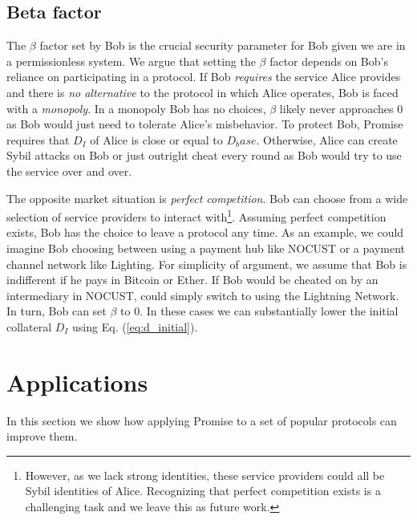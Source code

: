 \documentclass[runningheads]{llncs}
\newcommand{\sys}{Promise\xspace}
\newcommand{\aza}[1]{\todo[linecolor=blue,backgroundcolor=blue!25,bordercolor=blue,inline,caption={}]{Comment by Alexei: #1}}
\begin{document}
\subsection{Beta factor}
The $\beta$ factor set by Bob is the crucial security parameter for Bob given we are in a permissionless system.
We argue that setting the $\beta$ factor depends on Bob's reliance on participating in a protocol.
If Bob \emph{requires} the service Alice provides and there is \emph{no alternative} to the protocol in which Alice operates, Bob is faced with a \emph{monopoly}.
In a monopoly Bob has no choices, $\beta$ likely never approaches 0 as Bob would just need to tolerate Alice's misbehavior.
To protect Bob, \sys requires that $D_I$ of Alice is close or equal to $D_base$.
Otherwise, Alice can create Sybil attacks on Bob or just outright cheat every round as Bob would try to use the service over and over.

The opposite market situation is \emph{perfect competition}.
Bob can choose from a wide selection of service providers to interact with\footnote{
However, as we lack strong identities, these service providers could all be Sybil identities of Alice.
Recognizing that perfect competition exists is a challenging task and we leave this as future work.}.
Assuming perfect competition exists, Bob has the choice to leave a protocol any time.
As an example, we could imagine Bob choosing between using a payment hub like NOCUST or a payment channel network like Lighting.
For simplicity of argument, we assume that Bob is indifferent if he pays in Bitcoin or Ether.
If Bob would be cheated on by an intermediary in NOCUST, could simply switch to using the Lightning Network.
In turn, Bob can set $\beta$ to 0.
In these cases we can substantially lower the initial collateral $D_I$ using Eq. (\ref{eq:d_initial}).







\section{Applications}
\label{sec:application}

In this section we show how applying \sys to a set of popular protocols can improve them.
\end{document}
